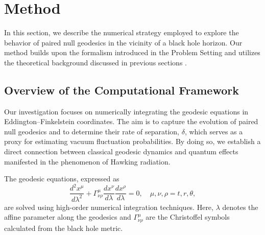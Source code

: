 \documentclass{article}\usepackage[utf8]{inputenc} %
\begin{document}
\section{Method}
In this section, we describe the numerical strategy employed to explore the behavior of paired null geodesics in the vicinity of a black hole horizon. Our method builds upon the formalism introduced in the Problem Setting and utilizes the theoretical background discussed in previous sections \cite{Hawking1975,Jacobson1993,Unruh1976}. 

\subsection{Overview of the Computational Framework}
Our investigation focuses on numerically integrating the geodesic equations in Eddington–Finkelstein coordinates. The aim is to capture the evolution of paired null geodesics and to determine their rate of separation, $\delta$, which serves as a proxy for estimating vacuum fluctuation probabilities. By doing so, we establish a direct connection between classical geodesic dynamics and quantum effects manifested in the phenomenon of Hawking radiation.

The geodesic equations, expressed as
\begin{equation}
\frac{d^2x^{\mu}}{d\lambda^2}+\Gamma^{\mu}_{\nu\rho}\frac{dx^{\nu}}{d\lambda}\frac{dx^{\rho}}{d\lambda}=0, \quad \mu,\nu,\rho=t, r, \theta,
\end{equation}
are solved using high-order numerical integration techniques. Here, $\lambda$ denotes the affine parameter along the geodesics and $\Gamma^{\mu}_{\nu\rho}$ are the Christoffel symbols calculated from the black hole metric. 
\end{document}
